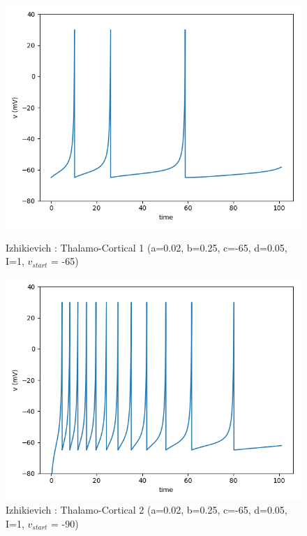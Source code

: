 \documentclass[12pt]{scrartcl}
\begin{document}
\begin{figure}[!h]
\begin{minipage}[l]{.48\linewidth}
\centering
\includegraphics[scale=0.5]{imgs/izTC1.png}
\caption{Izhikievich : Thalamo-Cortical 1 (a=0.02, b=0.25, c=-65, d=0.05, I=1, $v_{start}$ = -65)}
\label{izTC1}
\end{minipage}\hfill
\begin{minipage}[l]{.48\linewidth}
\centering
\includegraphics[scale=0.5]{imgs/izTC2.png}
\caption{Izhikievich : Thalamo-Cortical 2 (a=0.02, b=0.25, c=-65, d=0.05, I=1, $v_{start}$ = -90)}
\label{izTC2}
\end{minipage}\hfill
\end{figure}
\end{document}
